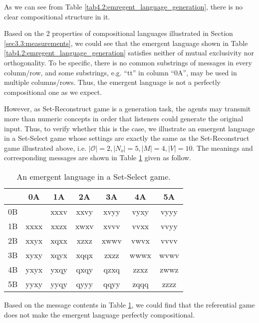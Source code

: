 As we can see from Table \ref{tab4.2:emregent_language_generation}, there is no clear compositional structure in it. 

Based on the 2 properties of compositional languages illustrated in Section \ref{sec3.3:measurements}, we could see that the emergent language shown in Table \ref{tab4.2:emregent_language_generation} satisfies neither of mutual exclusivity nor orthogonality. To be specific, there is no common substrings of messages in every column/row, and some substrings, e.g. ``tt'' in column ``0A'', may be used in multiple columns/rows. Thus, the emergent language is not a perfectly compositional one as we expect.

However, as Set-Reconstruct game is a generation task, the agents may transmit more than numeric concepts in order that listeners could generate the original input. Thus, to verify whether this is the case, we illustrate an emergent language in a Set-Select game whose settings are exactly the same as the Set-Reconstruct game illustrated above, i.e. $|\mathcal{O}|=2, |N_o|=5, |M|=4, |V|=10$. The meanings and corresponding messages are shown in Table \ref{tab4.3:emregent_language_referential} given as follow.

\begin{table}[!h]
    \centering
    \begin{tabular}{|c|c|c|c|c|c|c|}
        \hline
           & 0A   & 1A   & 2A   & 3A   & 4A   & 5A   \\ \hline
        0B &      & xxxv & xxvy & xvyy & vyxy & vyyy \\ \hline
        1B & xxxx & xxzx & xwxv & xvvv & vvxx & vvyy \\ \hline
        2B & xxyx & xqxx & xzxz & xwwv & vwvx & vvvv \\ \hline
        3B & xyxy & xqyx & xqqx & zxzz & wwwx & wvwv \\ \hline
        4B & yxyx & yxqy & qxqy & qzxq & zzxz & zwwz \\ \hline
        5B & yyxy & yyqy & qyyy & qqyy & zqqq & zzzz \\ \hline
        \end{tabular}
    \caption{An emergent language in a Set-Select game.}
    \label{tab4.3:emregent_language_referential}
\end{table}

Based on the message contents in Table \ref{tab4.3:emregent_language_referential}, we could find that the referential game does not make the emergent language perfectly compositional. 

